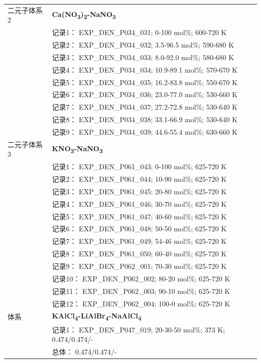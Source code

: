 \documentclass[12pt]{article}
\begin{document}
{\begin{longtable}[]{@{}
  >{\raggedright\arraybackslash}p{}
  >{\raggedright\arraybackslash}p{}@{}}
二元子体系 2  & \textbf{Ca(NO\textsubscript{3})\textsubscript{2}-NaNO\textsubscript{3}} \\
 & 记录1： EXP\_DEN\_P034\_031; 0-100 mol\%; 600-720 K \\
 & 记录2： EXP\_DEN\_P034\_032; 3.5-96.5 mol\%; 590-680 K \\
 & 记录3： EXP\_DEN\_P034\_033; 8.0-92.0 mol\%; 580-680 K \\
 & 记录4： EXP\_DEN\_P034\_034; 10.9-89.1 mol\%; 570-670 K \\
 & 记录5： EXP\_DEN\_P034\_035; 16.2-83.8 mol\%; 550-670 K \\
 & 记录6： EXP\_DEN\_P034\_036; 23.0-77.0 mol\%; 530-660 K \\
 & 记录7： EXP\_DEN\_P034\_037; 27.2-72.8 mol\%; 530-640 K \\
 & 记录8： EXP\_DEN\_P034\_038; 33.1-66.9 mol\%; 530-640 K \\
 & 记录9： EXP\_DEN\_P034\_039; 44.6-55.4 mol\%; 630-660 K  \\

二元子体系 3  & \textbf{KNO\textsubscript{3}-NaNO\textsubscript{3}} \\
 & 记录1： EXP\_DEN\_P061\_043; 0-100 mol\%; 625-720 K \\
 & 记录2： EXP\_DEN\_P061\_044; 10-90 mol\%; 625-720 K \\
 & 记录3： EXP\_DEN\_P061\_045; 20-80 mol\%; 625-720 K \\
 & 记录4： EXP\_DEN\_P061\_046; 30-70 mol\%; 625-720 K \\
 & 记录5： EXP\_DEN\_P061\_047; 40-60 mol\%; 625-720 K \\
 & 记录6： EXP\_DEN\_P061\_048; 50-50 mol\%; 625-720 K \\
 & 记录7： EXP\_DEN\_P061\_049; 54-46 mol\%; 625-720 K \\
 & 记录8： EXP\_DEN\_P061\_050; 60-40 mol\%; 625-720 K \\
 & 记录9： EXP\_DEN\_P062\_001; 70-30 mol\%; 625-720 K \\
 & 记录10： EXP\_DEN\_P062\_002; 80-20 mol\%; 625-720 K \\
 & 记录11： EXP\_DEN\_P062\_003; 90-10 mol\%; 625-720 K \\
 & 记录12： EXP\_DEN\_P062\_004; 100-0 mol\%; 625-720 K  \\

\midrule
体系 & \textbf{KAlCl\textsubscript{4}-LiAlBr\textsubscript{4}-NaAlCl\textsubscript{4}} \\
 & 记录1： EXP\_DEN\_P047\_019; 20-30-50 mol\%; 373 K; 0.474/0.474/- \\
 & 总体： 0.474/0.474/-  \\


\end{longtable}}
\end{document}
